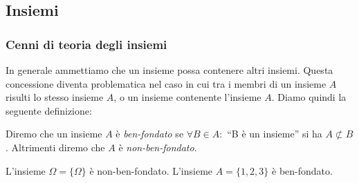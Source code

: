 \subsection{Insiemi}
\subsubsection{Cenni di teoria degli insiemi}
In generale ammettiamo che un insieme possa contenere altri insiemi. Questa concessione diventa problematica nel caso in cui tra i membri di un insieme $A$ risulti lo stesso insieme $A$, o un insieme contenente l'insieme $A$. Diamo quindi la seguente definizione:
\begin{definition}
    Diremo che un insieme $A$ è \emph{ben-fondato} se $\forall B \in A : $ ``B è un insieme'' si ha $A \not\subset B$. Altrimenti diremo che $A$ è \emph{non-ben-fondato}.
\end{definition}
\begin{example}
    L'insieme $\Omega = \{\Omega\}$ è non-ben-fondato. L'insieme $A = \{1,2,3\}$ è ben-fondato.
\end{example}

